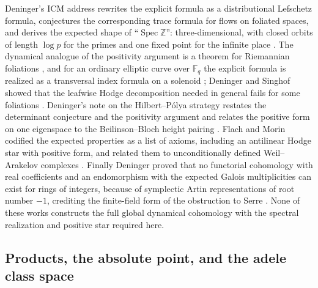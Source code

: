 \documentclass[11pt]{amsart}
\theoremstyle{plain}
\theoremstyle{definition}
\theoremstyle{remark}
\numberwithin{equation}{section}
\newcommand{\Z}{\mathbb{Z}}
\newcommand{\F}{\mathbb{F}}
\DeclareMathOperator{\Spec}{Spec}
\begin{document}
Deninger's ICM address \cite{Deninger1998Analogies} rewrites the
explicit formula as a distributional Lefschetz formula, conjectures the
corresponding trace formula for flows on foliated spaces, and derives
the expected shape of ``$\Spec\Z$'': three-dimensional, with closed
orbits of length $\log p$ for the primes and one fixed point for the
infinite place \cite[(5)--(6), pp.~170--171, (20)--(22),
pp.~179--180, and p.~181]{Deninger1998Analogies}. The dynamical
analogue of the positivity argument is a theorem for Riemannian
foliations \cite[Theorem~2.1, p.~8]{Deninger2001NumberTheory}, and for
an ordinary elliptic curve over $\F_q$ the explicit formula is realized
as a transversal index formula on a solenoid
\cite{Deninger2002Explicit}; Deninger and Singhof showed that the
leafwise Hodge decomposition needed in general fails for some
foliations \cite[Proposition~1.2, p.~214]{DeningerSinghof2001Counterexample}.
Deninger's note on the Hilbert--P\'olya strategy restates the
determinant conjecture and the positivity argument and relates the
positive form on one eigenspace to the Beilinson--Bloch height pairing
\cite[Conjecture~2, p.~3, pp.~4--5, and pp.~7--9]%
{Deninger2010HilbertPolya}. Flach and Morin codified the expected
properties as a list of axioms, including an antilinear Hodge star with
positive form, and related them to unconditionally defined
Weil--Arakelov complexes \cite[Conjecture~2.3, p.~522, Conjecture~4.1,
and Theorem~4.3, p.~527]{FlachMorin2020DeningerWeilArakelov}. Finally
Deninger proved that no functorial cohomology with real coefficients
and an endomorphism with the expected Galois multiplicities can exist
for rings of integers, because of symplectic Artin representations of
root number $-1$, crediting the finite-field form of the obstruction
to Serre \cite[\S1, p.~1, and Theorem~2.13, p.~5]{Deninger2022NoWeil}.
None of these works constructs the full global dynamical cohomology
with the spectral realization and positive star required here.


\subsection{Products, the absolute point, and the adele class
space}\label{subsec:prior-cc}
\end{document}
